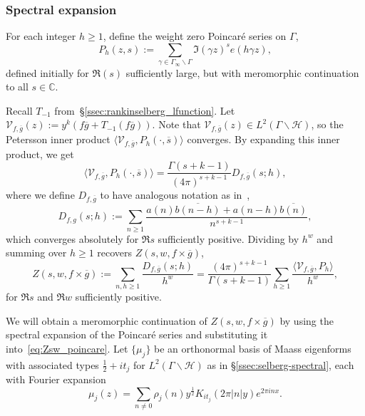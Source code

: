 \subsubsection{Spectral expansion}


For each integer $h \geq 1$, define the weight zero Poincar\'{e} series on $\Gamma$,
\begin{equation}
  P_h(z,s):=\sum_{\gamma \in\Gamma_\infty \backslash \Gamma} \Im(\gamma z)^s e\left(h
  \gamma z\right),
\end{equation}
defined initially for $\Re(s)$ sufficiently large, but with meromorphic continuation to
all $s\in\mathbb{C}$.


Recall $T_{-1}$ from~\S\ref{ssec:rankinselberg_lfunction}.
Let $\mathcal{V}_{f,\overline{g}}(z) :=y^k (f \overline{g}+T_{-1}(f\overline{g}))$.
Note that $\mathcal{V}_{f, \overline{g}}(z) \in L^2(\Gamma \backslash \mathcal{H})$, so
the Petersson inner product $\langle \mathcal{V}_{f, \overline{g}}, P_h(\cdot,
\overline{s}) \rangle$ converges.
By expanding this inner product, we get
\begin{equation}
  \langle \mathcal{V}_{f,\overline{g}} ,P_h(\cdot, \overline{s}) \rangle
  =\frac{\Gamma\left({s}+k -1\right)}{\left(4\pi \right)^{{s}+ k -1}}
  D_{f,\overline{g}}({s};h),
\end{equation}
where we define $D_{f, \overline{g}}$ to have analogous notation as
in~\cite{HoffsteinHulse13},
\begin{equation}
  D_{f,g}(s;h) := \sum_{n \geq
  1}\frac{a(n)\overline{b(n-h)}+a(n-h)\overline{b(n)}}{n^{s+k-1}},
\end{equation}
which converges absolutely for $\Re s$ sufficiently positive.
Dividing by $h^w$ and summing over $h \geq 1$ recovers $Z(s, w, f\times \overline{g} )$,
\begin{equation}\label{eq:Zsw_poincare}
  Z(s, w, f\times \overline{g} ) := \sum_{n, h \geq 1} \frac{D_{f, \overline{g}
  }(s;h)}{h^w} = \frac{(4\pi)^{s+k-1}}{\Gamma(s+k-1)} \sum_{h \geq 1} \frac{\langle
  \mathcal{V}_{f,\overline{g} }, P_h \rangle}{h^w},
\end{equation}
for $\Re s$ and $\Re w$ sufficiently positive.


We will obtain a meromorphic continuation of $Z(s, w, f\times \overline{g} )$ by using the
spectral expansion of the Poincar\'e series and substituting it
into~\eqref{eq:Zsw_poincare}.
Let $\{\mu_j\}$ be an orthonormal basis of Maass eigenforms with associated types
$\frac{1}{2} + it_j$ for $L^2(\Gamma \backslash \mathcal{H})$ as in
\S\ref{ssec:selberg-spectral}, each with Fourier expansion
\begin{equation}
  \mu_j(z)=\sum_{n \neq 0} \rho_j(n)y^{\frac{1}{2}}K_{it_j}(2\pi \vert n \vert y)
  e^{2\pi i n x}.
\end{equation}


